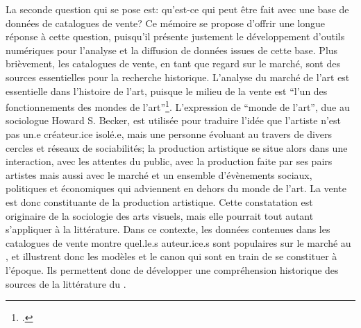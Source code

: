 La seconde question qui se pose est: qu'est-ce qui peut être fait avec une base de données de catalogues de vente? Ce mémoire se propose d'offrir une longue réponse à cette question, puisqu'il présente justement le développement d'outils numériques pour l'analyse et la diffusion de données issues de cette base. Plus brièvement, les catalogues de vente, en tant que regard sur le marché, sont des sources essentielles pour la recherche historique. L'analyse du marché de l'art est essentielle dans l'histoire de l'art, puisque le milieu de la vente est \enquote{l'un des fonctionnements des mondes de l'art}\footcite[p. 64]{de_maupeou_les_2013}. L'expression de \enquote{monde de l'art}, due au sociologue Howard S. Becker, est utilisée pour traduire l'idée que l'artiste n'est pas un.e créateur.ice isolé.e, mais une personne évoluant au travers de divers cercles et réseaux de sociabilités; la production artistique se situe alors dans une interaction, avec les attentes du public, avec la production faite par ses pairs artistes mais aussi avec le marché et un ensemble d'évènements sociaux, politiques et économiques qui adviennent en dehors du monde de l'art. La vente est donc constituante de la production artistique. Cette constatation est originaire de la sociologie des arts visuels, mais elle pourrait tout autant s'appliquer à la littérature. Dans ce contexte, les données contenues dans les catalogues de vente montre quel.le.s auteur.ice.s sont populaires sur le marché au , et illustrent donc les modèles et le canon qui sont en train de se constituer à l'époque. Ils permettent donc de développer une compréhension historique des sources de la littérature du . 

